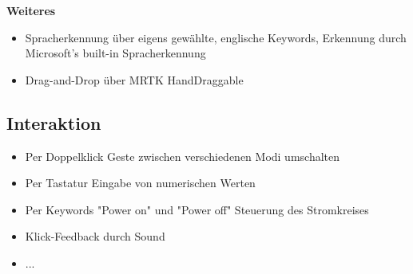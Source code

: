 \textbf{Weiteres}
\begin{itemize}
	\item Spracherkennung über eigens gewählte, englische Keywords, Erkennung durch Microsoft's built-in Spracherkennung
	\item Drag-and-Drop über MRTK HandDraggable 
\end{itemize}

\subsection{Interaktion}
\begin{itemize}
	\item Per Doppelklick Geste zwischen verschiedenen Modi umschalten
	\item Per Tastatur Eingabe von numerischen Werten
	\item Per Keywords "Power on" und "Power off" Steuerung des Stromkreises
	\item Klick-Feedback durch Sound
	\item ...
\end{itemize}
